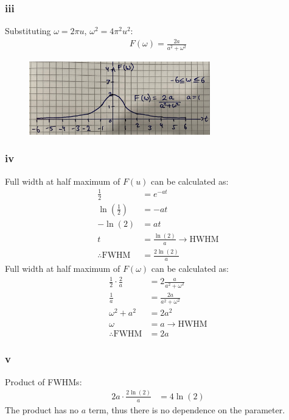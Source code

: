 \documentclass[11pt]{article}
\numberwithin{equation}{section}
\begin{document}
\subsubsection*{iii}
Substituting $\omega = 2\pi u$, $\omega^2 = 4\pi^2 u^2$:
\begin{align}
	F(\omega) = \frac{2a}{a^2 + \omega^2}
\end{align}
\begin{figure}[H]
	\centering
	\includegraphics[width = 0.7\textwidth]{./img/q1eiii.JPG}
	\caption{}
\end{figure}
\subsubsection*{iv}
Full width at half maximum of $F\left(u\right)$ can be calculated as:
\begin{align}
	\frac{1}{2} &= e^{-at}\\
	\ln \left(\frac{1}{2}\right) &= -at\\
	-\ln \left(2\right) &= at\\
	t &= \frac{\ln \left( 2 \right)}{a} \rightarrow \textrm{HWHM}\\
	\therefore \textrm{FWHM} &= \frac{2\ln \left( 2 \right)}{a}
\end{align}
Full width at half maximum of $F\left(\omega\right)$ can be calculated as:
\begin{align}
	\frac{1}{2}\cdot\frac{2}{a} &= 2\frac{a}{a^2 + \omega^2}\\
	\frac{1}{a} &= \frac{2a}{a^2 + \omega^2}\\
	\omega^2 + a^2 &= 2a^2\\
	\omega &= a \rightarrow \textrm{HWHM}\\
	\therefore \textrm{FWHM} &= 2a 
\end{align}
\subsubsection*{v}
Product of FWHMs:
\begin{align}
	2a\cdot \frac{2\ln\left(2\right)}{a} &= 4\ln\left(2\right)
\end{align}
The product has no $a$ term, thus there is no dependence on the parameter.
\end{document}
